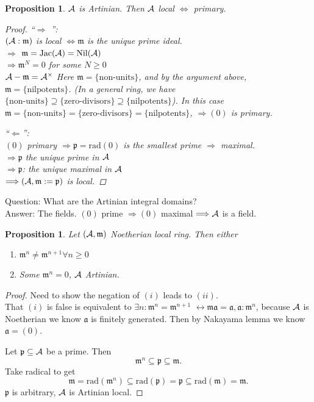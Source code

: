 \documentclass[11pt]{article}
\newtheorem{prop}[thm]{Proposition}
\newcommand{\sca}{{\mathfrak a}}
\newcommand{\scm}{{\mathfrak m}}
\newcommand{\scp}{{\mathfrak p}}
\newcommand{\cala}{{\cal A}}
\newcommand{\Lrta}{\Longrightarrow}
\newcommand{\llrta}{\longleftrightarrow}
\newcommand{\Llta}{\Longleftarrow}
\newcommand{\Llrta}{\Longleftrightarrow}
\begin{document}
\begin{prop}\label{prop:artin_local=artin_primary}
$\cala$ is Artinian.  Then $\cala$ local $\Llrta $ primary.
\begin{proof}
``$\Lrta$ '':\\
$(\cala:\scm)$ is local $\Llrta \scm $ is the unique prime ideal.\\
$\Lrta$ $\scm=\text{Jac}(\cala)=\text{Nil}(  \cala)$\\
$\Lrta\scm^N=0$ for some $N\geq 0$\\
$\cala-\scm=\cala^\times$
Here $\scm=\{\text{non-units}\}$, and by the argument above, $\scm=\{\text{nilpotents}\}$. (In a general ring, we have $\{\text{non-units}\}\supseteq\{\text{zero-divisors}\}\supseteq\{\text{nilpotents}\}$). In this case $\scm=\{\text{non-units}\}=\{\text{zero-divisors}\}=\{\text{nilpotents}\}$, $\Lrta(0)$ is primary.

``$\Llta$'':\\
 $(0)$ primary $\Lrta \scp=\text{rad}(0)$ is the smallest prime $\Lrta$ maximal.\\
$\Lrta\scp$ the unique prime in $\cala$\\
$\Lrta\scp$: the unique maximal in $\cala$\\
$\Lrta(\cala,\scm:=\scp)$ is local.

\end{proof}
\end{prop}

Question: What are the Artinian   integral domains?\\
Answer: The fields. $(0)$ prime $\Lrta (0)$ maximal $\Lrta \cala$ is a field. 

\begin{prop}
Let $(\cala,\scm)$ Noetherian local ring. Then either 
\begin{enumerate}[label=(\roman*)]
\item $\scm^n\neq \scm^{n+1}\forall n\geq 0$
\item Some $\scm^n=0$, $\cala$ Artinian. 
\end{enumerate}
\end{prop}
\begin{proof}
Need to show the negation of $(i)$ leads to $(ii)$.\\
That $(i)$ is false is equivalent to $\exists n:\scm^n=\scm^{n+1}$ $\llrta \scm\sca=\sca,\sca:\scm^n$, because $\cala$ is Noetherian we know $\sca$ is finitely generated. Then by Nakayama lemma we know $\sca=(0)$.

Let $\scp\subseteq \cala$ be a prime. Then $$\scm^n\subseteq \scp\subseteq \scm.$$ 
Take radical to get
$$
\scm=\text{rad}(\scm^n)\subseteq\text{rad}(\scp)=\scp\subseteq \text{rad}(\scm)=\scm.
$$
$\scp$ is arbitrary, $\cala$ is Artinian   local.
\end{proof}
\end{document}
